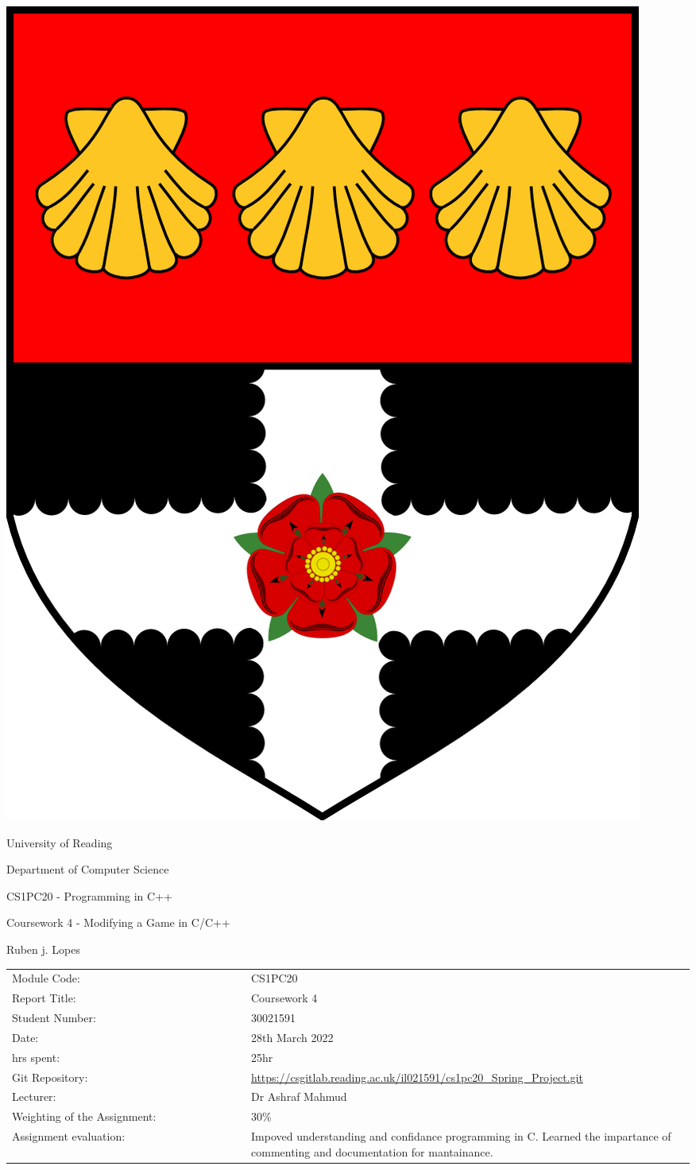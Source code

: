\documentclass[12pt]{article}
\begin{document}
\thispagestyle{empty}
\begin{center}
    \includegraphics[width=0.3\linewidth]{./images/Reading_shield.png}
    \par
    \large{University of Reading}\par
    \vspace{0.5 cm}
    {Department of Computer Science}\par
    \vspace{0.5 cm}
    {\Large     CS1PC20 - Programming in C++   \par} %
    {           Coursework 4 - Modifying a Game in C/C++    \par} %
    {\Large     Ruben j. Lopes   \par} %
    \begin{center}
        \begin{tabular}{p{0.35\linewidth}p{0.8\linewidth}}
            Module Code: &         CS1PC20           \\ 
            Report Title: &        Coursework 4           \\  
            Student Number: &      30021591           \\
            Date: &                28th March 2022           \\
            hrs spent: &           25hr           \\
            Git Repository: &      \url{https://csgitlab.reading.ac.uk/il021591/cs1pc20_Spring_Project.git}         \\ 
            Lecturer: &            Dr Ashraf Mahmud           \\
            Weighting of the Assignment: & 30\% \\
            Assignment evaluation: & Impoved understanding and confidance programming in C. Learned the impartance of commenting and documentation for mantainance. 
        \end{tabular}
    \end{center}
\end{center}

\tableofcontents

\end{document}
